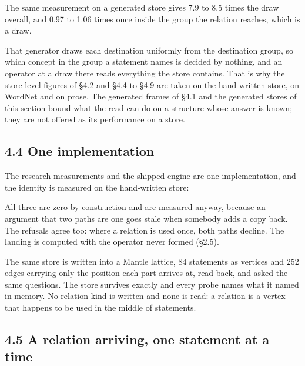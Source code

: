 \documentclass[10pt,letterpaper,twocolumn]{article}
\begin{document}
The same measurement on a generated store gives 7.9 to 8.5 times the draw overall, and 0.97 to 1.06
times once inside the group the relation reaches, which is a draw.

That generator draws each destination uniformly from the destination group, so which concept in the
group a statement names is decided by nothing, and an operator at a draw there reads everything the
store contains. That is why the store-level figures of §4.2 and §4.4 to §4.9 are taken on the
hand-written store, on WordNet and on prose. The generated frames of §4.1 and the generated stores of this section
bound what the read can do on a structure whose answer is known; they are not offered as its
performance on a store.

\subsection{4.4 One implementation}\label{44-one-implementation}

The research measurements and the shipped engine are one implementation, and the identity is
measured on the hand-written store:


All three are zero by construction and are measured anyway, because an argument that two paths are
one goes stale when somebody adds a copy back. The refusals agree too: where a relation is used once,
both paths decline. The landing is computed with the operator never formed (§2.5).

The same store is written into a Mantle lattice, 84 statements as vertices and 252 edges carrying
only the position each part arrives at, read back, and asked the same questions. The store survives
exactly and every probe names what it named in memory. No relation kind is written and none is read:
a relation is a vertex that happens to be used in the middle of statements.

\subsection{4.5 A relation arriving, one statement at a time}\label{45-a-relation-arriving-one-statement-at-a-time}
\end{document}
